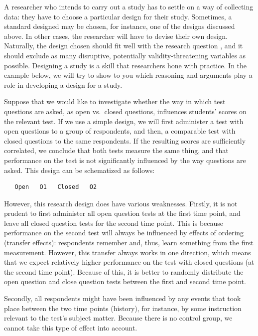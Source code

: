 \documentclass[
]{book}
\begin{document}
A researcher who intends to carry out a study has to settle on a way of collecting data: they have to choose a particular design for their study. Sometimes, a standard designed may be chosen, for instance, one of the designs discussed above. In other cases, the researcher will have to devise their own design. Naturally, the design chosen should fit well with the research question \citep{Levin99}, and it should exclude as many disruptive, potentially validity-threatening variables as possible. Designing a study is a skill that researchers hone with practice. In the example below, we will try to show to you which reasoning and arguments play a role in developing a design for a study.

Suppose that we would like to investigate whether the way in which test questions are asked, as open vs.~closed questions, influences students' scores on the relevant test. If we use a simple design, we will first administer a test with open questions to a group of respondents, and then, a comparable test with closed questions to the same respondents. If the resulting scores are sufficiently correlated, we conclude that both tests measure the same thing, and that performance on the test is not significantly influenced by the way questions are asked. This design can be schematized as follows:

\begin{verbatim}
   Open   O1   Closed   O2
\end{verbatim}

However, this research design does have various weaknesses. Firstly, it is not prudent to first administer all open question tests at the first time point, and leave all closed question tests for the second time point. This is because performance on the second test will always be influenced by effects of ordering (transfer effects): respondents remember and, thus, learn something from the first measurement. However, this transfer always works in one direction, which means that we expect relatively higher performance on the test with closed questions (at the second time point). Because of this, it is better to randomly distribute the open question and close question tests between the first and second time point.

Secondly, all respondents might have been influenced by any events that took place between the two time points (history), for instance, by some instruction relevant to the test's subject matter. Because there is no control group, we cannot take this type of effect into account.
\end{document}
